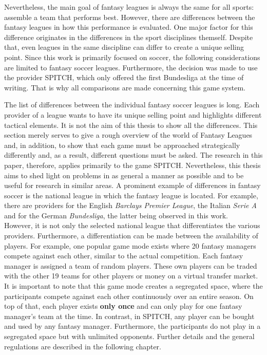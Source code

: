 Nevertheless, the main goal of fantasy leagues is always the same for all sports: assemble a team that performs best. However, there are differences between the fantasy leagues in how this performance is evaluated. One major factor for this difference originates in the differences in the sport disciplines themself. Despite that, even leagues in the same discipline can differ to create a unique selling point. Since this work is primarily focused on soccer, the following considerations are limited to fantasy soccer leagues. Furthermore, the decision was made to use the provider SPITCH, which only offered the first Bundesliga at the time of writing. That is why all comparisons are made concerning this game system. 

The list of differences between the individual fantasy soccer leagues is long. Each provider of a league wants to have its unique selling point and highlights different tactical elements. It is not the aim of this thesis to show all the differences. This section merely serves to give a rough overview of the world of Fantasy Leagues and, in addition, to show that each game must be approached strategically differently and, as a result, different questions must be asked. The research in this paper, therefore, applies primarily to the game SPITCH. Nevertheless, this thesis aims to shed light on problems in as general a manner as possible and to be useful for research in similar areas. A prominent example of differences in fantasy soccer is the national league in which the fantasy league is located. For example, there are providers for the English \emph{Barclays Premier League}, the Italian \emph{Serie A} and for the German \emph{Bundesliga}, the latter being observed in this work. \\
However, it is not only the selected national league that differentiates the various providers. Furthermore, a differentiation can be made between the availability of players. For example, one popular game mode exists where 20 fantasy managers compete against each other, similar to the actual competition. Each fantasy manager is assigned a team of random players. These own players can be traded with the other 19 teams for other players or money on a virtual transfer market. It is important to note that this game mode creates a segregated space, where the participants compete against each other continuously over an entire season. On top of that, each player exists \textbf{only once} and can only play for one fantasy manager's team at the time. In contrast, in SPITCH, any player can be bought and used by any fantasy manager. Furthermore, the participants do not play in a segregated space but with unlimited opponents. Further details and the general regulations are described in the following chapter.
